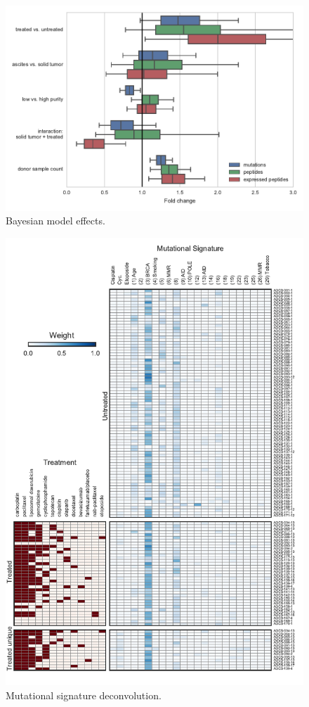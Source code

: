 \begin{figure}
\centering
\includegraphics[scale=1.0]{figures/bayesian_model_effects.pdf}
\caption{Bayesian model effects. }
\label{fig:bayesian}
\end{figure}

\begin{figure}
\centering
\includegraphics[scale=1.0]{figures/signatures.pdf}
\caption{Mutational signature deconvolution. }
\label{fig:signatures}
\end{figure}


